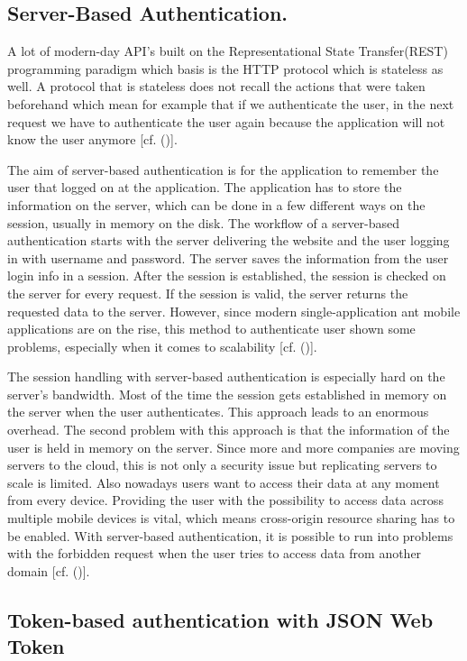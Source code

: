 \subsection{Server-Based Authentication.}
A lot of modern-day API’s built on the Representational State Transfer(REST) programming paradigm which basis is the HTTP protocol which is stateless as well. A protocol that is stateless does not recall the actions that were taken beforehand which mean for example that if we authenticate the user, in the next request we have to authenticate the user again because the application will not know the user anymore [cf. (\cite{Serilleja:2015:Scothio})]. 

The aim of server-based authentication is for the application to remember the user that logged on at the application. The application has to store the information on the server, which can be done in a few different ways on the session, usually in memory on the disk. The workflow of a server-based authentication starts with the server delivering the website and the user logging in with username and password. The server saves the information from the user login info in a session. After the session is established, the session is checked on the server for every request. If the session is valid, the server returns the requested data to the server. However, since modern single-application ant mobile applications are on the rise, this method to authenticate user shown some problems, especially when it comes to scalability [cf. (\cite{Serilleja:2015:Scothio})]. 

The session handling with server-based authentication is especially hard on the server’s bandwidth. Most of the time the session gets established in memory on the server when the user authenticates. This approach leads to an enormous overhead. The second problem with this approach is that the information of the user is held in memory on the server. Since more and more companies are moving servers to the cloud, this is not only a security issue but replicating servers to scale is limited. Also nowadays users want to access their data at any moment from every device. Providing the user with the possibility to access data across multiple mobile devices is vital, which means cross-origin resource sharing has to be enabled. With server-based authentication, it is possible to run into problems with the forbidden request when the user tries to access data from another domain [cf. (\cite{Serilleja:2015:Scothio})].


\subsection{
	Token-based authentication with JSON Web Token
}


